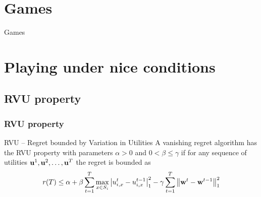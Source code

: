 \documentclass{beamer}
\renewcommand{\vec}[1]{\ensuremath{{\bf #1}}}
\begin{document}
\section{Games}
\begin{frame}[c]
	\begin{center}
		\Huge Games
	\end{center}
\end{frame}


\section{Playing under nice conditions}

\subsection{RVU property}

\begin{frame}
	\frametitle{RVU property}
	\begin{block}{RVU -- Regret bounded by Variation in Utilities}
		A vanishing regret algorithm has the RVU property with parameters $\alpha>0$ and $0<\beta\leq\gamma$  if for any sequence of utilities $\vec{u}^1, \vec{u}^2, \ldots, \vec{u}^T$ the regret is bounded as 
		\begin{equation*}
		r(T) \leq \alpha
		+\beta \sum_{t=1}^{T} \max_{x \in S_i} \left| u_{i,x}^t - u_{i,x}^{t-1} \right|_1^2 -
		\gamma\sum_{t=1}^{T} \left\|\vec{w}^{t} - \vec{w}^{t-1}\right\|^2_1
		\end{equation*}  
	\end{block}
	

\end{frame}

\end{document}
